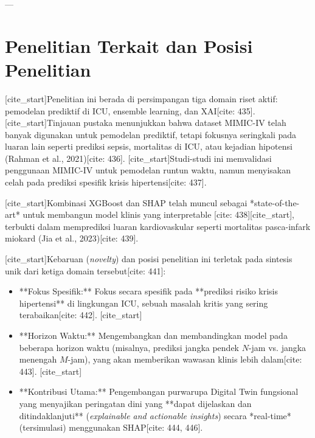 ---
\section{Penelitian Terkait dan Posisi Penelitian}
[cite_start]Penelitian ini berada di persimpangan tiga domain riset aktif: pemodelan prediktif di ICU, ensemble learning, dan XAI[cite: 435]. [cite_start]Tinjauan pustaka menunjukkan bahwa dataset MIMIC-IV telah banyak digunakan untuk pemodelan prediktif, tetapi fokusnya seringkali pada luaran lain seperti prediksi sepsis, mortalitas di ICU, atau kejadian hipotensi (Rahman et al., 2021)[cite: 436]. [cite_start]Studi-studi ini memvalidasi penggunaan MIMIC-IV untuk pemodelan runtun waktu, namun menyisakan celah pada prediksi spesifik krisis hipertensi[cite: 437].

[cite_start]Kombinasi XGBoost dan SHAP telah muncul sebagai *state-of-the-art* untuk membangun model klinis yang interpretable [cite: 438][cite_start], terbukti dalam memprediksi luaran kardiovaskular seperti mortalitas pasca-infark miokard (Jia et al., 2023)[cite: 439].

[cite_start]Kebaruan (\textit{novelty}) dan posisi penelitian ini terletak pada sintesis unik dari ketiga domain tersebut[cite: 441]:
\begin{itemize}
    [cite_start]\item **Fokus Spesifik:** Fokus secara spesifik pada **prediksi risiko krisis hipertensi** di lingkungan ICU, sebuah masalah kritis yang sering terabaikan[cite: 442].
    [cite_start]\item **Horizon Waktu:** Mengembangkan dan membandingkan model pada beberapa horizon waktu (misalnya, prediksi jangka pendek $N$-jam vs. jangka menengah $M$-jam), yang akan memberikan wawasan klinis lebih dalam[cite: 443].
    [cite_start]\item **Kontribusi Utama:** Pengembangan purwarupa Digital Twin fungsional yang menyajikan peringatan dini yang **dapat dijelaskan dan ditindaklanjuti** (\textit{explainable and actionable insights}) secara *real-time* (tersimulasi) menggunakan SHAP[cite: 444, 446].
\end{itemize}

